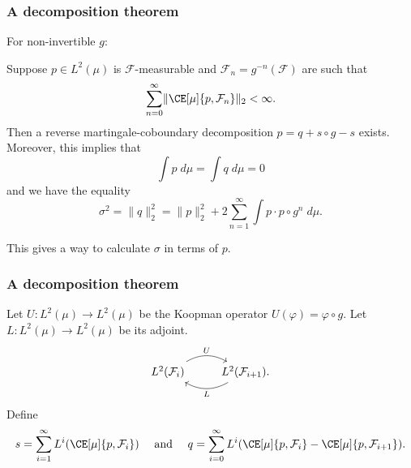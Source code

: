 \documentclass[shortlabels, 9pt, aspectratio=2013]{beamer}
\begin{document}
\begin{frame}
  \frametitle{A decomposition theorem}
  For non-invertible \(g\):
  \begin{theorem}\label{thm:decomposition-existence}
    Suppose \(p \in L^2(\mu)\) is \(\mathcal{F}\)-measurable and \(\mathcal{F}_n = g^{-n}(\mathcal{F})\) are such that
    \begin{equation*}
      \sum_{n = 0}^{\infty} \lVert \CE[\mu]{p, \mathcal{F}_n} \rVert_2 < \infty.
    \end{equation*}
    Then a reverse martingale-coboundary decomposition \(p = q + s \circ g - s\) exists. Moreover, this implies that
    \begin{equation*}
      \int p \;d\mu = \int q \;d\mu = 0
    \end{equation*}
    and we have the equality
    \begin{equation*}
      \sigma ^2 = \lVert q \rVert^2_2 = \lVert p \rVert_2^2 + 2\sum_{n = 1}^{\infty} \int p \cdot p \circ g^n \;d\mu.
    \end{equation*}
  \end{theorem}
  This gives a way to calculate \(\sigma\) in terms of \(p\).
\end{frame}

\begin{frame}[fragile]
  \frametitle{A decomposition theorem}
  \begin{proofs}
    Let \(U \colon L^2(\mu) \to L^2(\mu)\) be the Koopman operator \(U(\varphi) = \varphi \circ g\). Let \(L \colon L^2(\mu) \to L^2(\mu)\) be its adjoint.
    \[
      \begin{tikzcd}
        {L^2(\mathcal{F}_i)} & {L^2(\mathcal{F}_{i+1})}
        \arrow["U", bend left, from=1-1, to=1-2]
        \arrow["L", bend left, from=1-2, to=1-1].
      \end{tikzcd}
    \]
    Define
    \begin{equation*}
      s = \sum_{i = 1}^{\infty} L^i(\CE[\mu]{p,\mathcal{F}_i})\quad\text{ and }\quad
      q = \sum_{i = 0}^{\infty} L^i(\CE[\mu]{p,\mathcal{F}_i} - \CE[\mu]{p, \mathcal{F}_{i + 1}}).
    \end{equation*}
  \end{proofs}
\end{frame}
\end{document}

